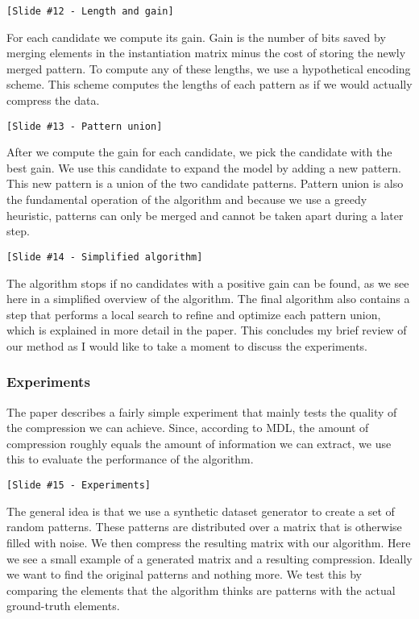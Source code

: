 \documentclass[10pt,a4paper,oneside]{article}
\begin{document}
\begin{verbatim}
[Slide #12 - Length and gain]
\end{verbatim}

For each candidate we compute its gain. Gain is the number of bits saved by merging elements in the instantiation matrix minus the cost of storing the newly merged pattern. To compute any of these lengths, we use a hypothetical encoding scheme. This scheme computes the lengths of each pattern as if we would actually compress the data. 

\begin{verbatim}
[Slide #13 - Pattern union]
\end{verbatim}
 
After we compute the gain for each candidate, we pick the candidate with the best gain. We use this candidate to expand the model by adding a new pattern. This new pattern is a union of the two candidate patterns. Pattern union is also the fundamental operation of the algorithm and because we use a greedy heuristic, patterns can only be merged and cannot be taken apart during a later step.

\begin{verbatim}
[Slide #14 - Simplified algorithm]
\end{verbatim}

The algorithm stops if no candidates with a positive gain can be found, as we see here in a simplified overview of the algorithm. The final algorithm also contains a step that performs a local search to refine and optimize each pattern union, which is explained in more detail in the paper. This concludes my brief review of our method as I would like to take a moment to discuss the experiments.

\subsubsection{Experiments}

The paper describes a fairly simple experiment that mainly tests the quality of the compression we can achieve. Since, according to MDL, the amount of compression roughly equals the amount of information we can extract, we use this to evaluate the performance of the algorithm.

\begin{verbatim}
[Slide #15 - Experiments]
\end{verbatim}

The general idea is that we use a synthetic dataset generator to create a set of random patterns. These patterns are distributed over a matrix that is otherwise filled with noise. We then compress the resulting matrix with our algorithm. Here we see a small example of a generated matrix and a resulting compression. Ideally we want to find the original patterns and nothing more. We test this by comparing the elements that the algorithm thinks are patterns with the actual ground-truth elements.
\end{document}
